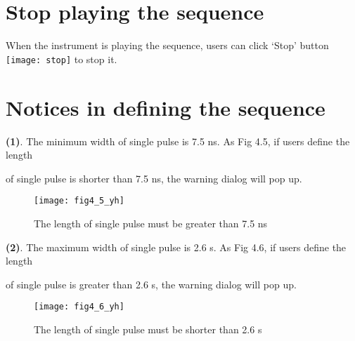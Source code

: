 \section{\heiti Stop playing the sequence}
\hspace{-0.2cm}When the instrument is playing the sequence, users can click `Stop' button \texttt{[image: stop]} to stop it.

\section{\heiti Notices in defining the sequence}

\vspace{0.4cm}
\noindent \textbf{(1)}. The minimum width of single pulse is 7.5 ns. As Fig 4.5, if users define the length

\hspace{0cm}of single pulse is shorter than 7.5 ns, the warning dialog will pop up.

\vspace{0.2cm}
\begin{figure}[H]
\centering
\texttt{[image: fig4\_5\_yh]}
\caption{\hspace{0.2cm}The length of single pulse must be greater than 7.5 ns}
\end{figure}

\vspace{0.4cm}
\noindent \textbf{(2)}. The maximum width of single pulse is 2.6 s. As Fig 4.6, if users define the length 

\hspace{0cm}of single pulse is greater than 2.6 s, the warning dialog will pop up.


\vspace{0.2cm}
\begin{figure}[ht]
\centering
\texttt{[image: fig4\_6\_yh]}
\caption{\hspace{0.2cm}The length of single pulse must be shorter than 2.6 s}
\end{figure}

